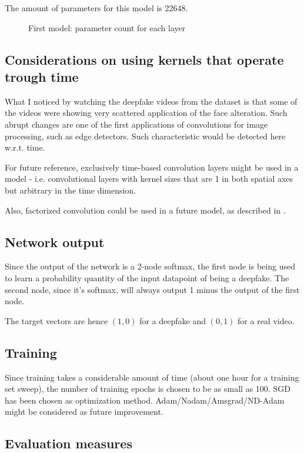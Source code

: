The amount of parameters for this model is 22648.

\begin{figure}[h]
\caption{First model: parameter count for each layer}
\centering

\end{figure}

\subsection{Considerations on using kernels that operate trough time}

What I noticed by watching the deepfake videos from the dataset is that some
of the videos were showing very scattered application of the face alteration.
Such abrupt changes are one of the first applications of convolutions for
image processing, such as edge detectors. Such characteristic would be 
detected here w.r.t. time.

For future reference, exclusively time-based convolution layers might be used
in a model - i.e. convolutional layers with kernel sizes that are 1 in both spatial
axes but arbitrary in the time dimension.

Also, factorized convolution could be used in a future model, as described in \cite{Burlacu}.

\subsection{Network output}

Since the output of the network is a 2-node softmax,
the first node is being used to learn a probability quantity of the input datapoint 
of being a deepfake. The second node, since it's softmax, will always output
1 minus the output of the first node.

The target vectors are hence $(1,0)$ for a deepfake and $(0,1)$ for a real video.

\subsection{Training}
Since training takes a considerable amount of time (about one hour for a training set
sweep), the number of training epochs is chosen to be as small as 100.
SGD has been chosen as optimization method. Adam/Nadam/Amsgrad/ND-Adam might be considered
as future improvement.

\subsection{Evaluation measures}

